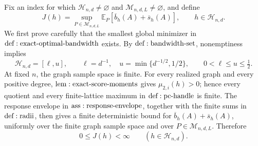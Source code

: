 Fix an index for which \(\mathcal H_{n,d}\ne\varnothing\) and \(\mathcal M_{n,d,L}\ne\varnothing\), and define
\[
 J(h)=\sup_{P\in\mathcal M_{n,d,L}}
 \mathbb E_P\!\left[\overline b_h(A)+\overline s_h(A)\right],
 \qquad h\in\mathcal H_{n,d}.
\tag{1}
\]
We first prove carefully that the smallest global minimizer in \({\rm def:exact\text{-}optimal\text{-}bandwidth}\) exists.  By \({\rm def:bandwidth\text{-}set}\), nonemptiness implies
\[
 \mathcal H_{n,d}=[\ell,u],\qquad \ell=d^{-1},\quad u=\min\{d^{-1/2},1/2\},
 \qquad 0<\ell\leq u\leq\tfrac12.
\tag{2}
\]
At fixed \(n\), the graph sample space is finite.  For every realized graph and every positive degree, \({\rm lem:exact\text{-}score\text{-}moments}\) gives \(\mu_{2,i}(h)>0\); hence every quotient and every finite-lattice maximum in \({\rm def:pc\text{-}handle}\) is finite.  The response envelope in \({\rm ass:response\text{-}envelope}\), together with the finite sums in \({\rm def:radii}\), then gives a finite deterministic bound for \(\overline b_h(A)+\overline s_h(A)\), uniformly over the finite graph sample space and over \(P\in\mathcal M_{n,d,L}\).  Therefore
\[
 0\leq J(h)<\infty\qquad(h\in\mathcal H_{n,d}).
\tag{3}
\]

